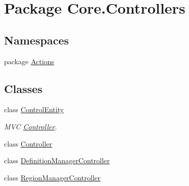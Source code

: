 \hypertarget{namespaceCore_1_1Controllers}{\section{Package Core.\-Controllers}
\label{namespaceCore_1_1Controllers}
}
\subsection*{Namespaces}
\begin{DoxyCompactItemize}
\item 
package \hyperlink{namespaceCore_1_1Controllers_1_1Actions}{Actions}
\end{DoxyCompactItemize}
\subsection*{Classes}
\begin{DoxyCompactItemize}
\item 
class \hyperlink{classCore_1_1Controllers_1_1ControlEntity}{Control\-Entity}
\begin{DoxyCompactList}\small\item\em M\-V\-C \hyperlink{classCore_1_1Controllers_1_1Controller}{Controller}. \end{DoxyCompactList}\item 
class \hyperlink{classCore_1_1Controllers_1_1Controller}{Controller}
\item 
class \hyperlink{classCore_1_1Controllers_1_1DefinitionManagerController}{Definition\-Manager\-Controller}
\item 
class \hyperlink{classCore_1_1Controllers_1_1RegionManagerController}{Region\-Manager\-Controller}
\end{DoxyCompactItemize}
